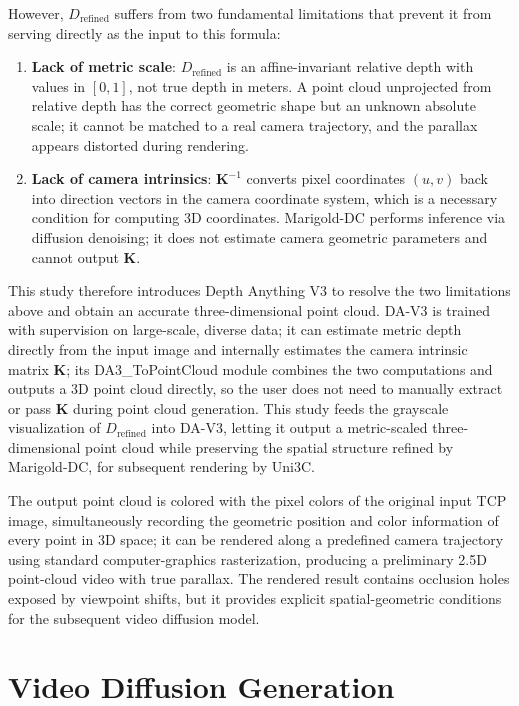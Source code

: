 However, $D_{\mathrm{refined}}$ suffers from two fundamental limitations that prevent it from serving directly as the input to this formula:

\begin{enumerate}
  \item \textbf{Lack of metric scale}: $D_{\mathrm{refined}}$ is an affine-invariant relative depth
        with values in $[0,1]$, not true depth in meters.
        A point cloud unprojected from relative depth has the correct geometric shape but an unknown absolute scale;
        it cannot be matched to a real camera trajectory, and the parallax appears distorted during rendering.
  \item \textbf{Lack of camera intrinsics}: $\mathbf{K}^{-1}$ converts pixel coordinates $(u,v)$ back into direction vectors in the camera coordinate system,
        which is a necessary condition for computing 3D coordinates.
        Marigold-DC performs inference via diffusion denoising; it does not estimate camera geometric parameters and cannot output $\mathbf{K}$.
\end{enumerate}

This study therefore introduces Depth Anything V3 \cite{depthanything}
to resolve the two limitations above and obtain an accurate three-dimensional point cloud.
DA-V3 is trained with supervision on large-scale, diverse data; it can estimate metric depth directly from the input image
and internally estimates the camera intrinsic matrix $\mathbf{K}$;
its DA3\_ToPointCloud module combines the two computations and outputs a 3D point cloud directly,
so the user does not need to manually extract or pass $\mathbf{K}$ during point cloud generation.
This study feeds the grayscale visualization of $D_{\mathrm{refined}}$ into DA-V3,
letting it output a metric-scaled three-dimensional point cloud
while preserving the spatial structure refined by Marigold-DC, for subsequent rendering by Uni3C.

The output point cloud is colored with the pixel colors of the original input TCP image,
simultaneously recording the geometric position and color information of every point in 3D space;
it can be rendered along a predefined camera trajectory using standard computer-graphics rasterization,
producing a preliminary 2.5D point-cloud video with true parallax.
The rendered result contains occlusion holes exposed by viewpoint shifts,
but it provides explicit spatial-geometric conditions for the subsequent video diffusion model.

\section{Video Diffusion Generation}
\label{sec:video}

